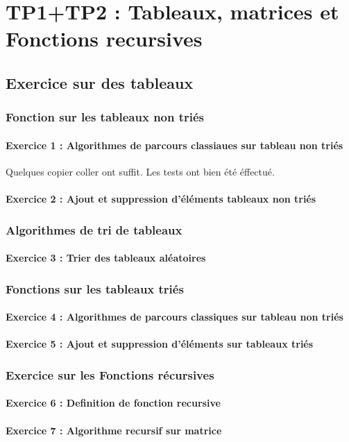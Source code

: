 \chapter{TP1+TP2 : Tableaux, matrices et Fonctions recursives}

\section{Exercice sur des tableaux}

\subsection{Fonction sur les tableaux non triés}

\subsubsection{Exercice 1 : Algorithmes de parcours classiaues sur tableau non triés}
Quelques copier coller ont suffit.
Les tests ont bien été éffectué.

\subsubsection{Exercice 2 : Ajout et suppression d'éléments tableaux non triés}

\subsection{Algorithmes de tri de tableaux}

\subsubsection{Exercice 3 : Trier des tableaux aléatoires}

\subsection{Fonctions sur les tableaux triés}

\subsubsection{Exercice 4 : Algorithmes de parcours classiques sur tableau non triés}

\subsubsection{Exercice 5 : Ajout et suppression d’éléments sur tableaux triés}

\subsection{Exercice sur les Fonctions récursives}

\subsubsection{Exercice 6 : Definition de fonction recursive}

\subsubsection{Exercice 7 : Algorithme recursif sur matrice}
